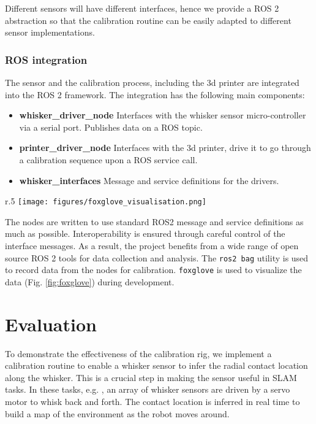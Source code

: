 \documentclass[runningheads]{llncs}
\begin{document}
Different sensors will have different interfaces, hence we provide a ROS 2 abstraction so that the calibration routine can be easily adapted to different sensor implementations.

\subsubsection{ROS integration}

The sensor and the calibration process, including the 3d printer are integrated into the ROS 2 framework. The integration has the following main components:

\begin{itemize}
    \item \textbf{whisker\_driver\_node} Interfaces with the whisker sensor micro-controller via a serial port. Publishes data on a ROS topic.
    \item \textbf{printer\_driver\_node} Interfaces with the 3d printer, drive it to go through a calibration sequence upon a ROS service call.
    \item \textbf{whisker\_interfaces} Message and service definitions for the drivers.
\end{itemize}

\begin{wrapfigure}{r}{.5\textwidth}
    \centering
    \texttt{[image: figures/foxglove\_visualisation.png]}
    \caption{Foxglove visualization of whisker sensor system running in ROS 2}
    \label{fig:foxglove}
\end{wrapfigure}

The nodes are written to use standard ROS2 message and service definitions as much as possible. Interoperability is ensured through careful control of the interface messages. As a result, the project benefits from a wide range of open source ROS 2 tools for data collection and analysis. The \verb|ros2 bag| utility is used to record data from the nodes for calibration. \verb|foxglove| is used to visualize the data (Fig. \ref{fig:foxglove}) during development.

\section{Evaluation}

To demonstrate the effectiveness of the calibration rig, we implement a calibration routine to enable a whisker sensor to infer the radial contact location along the whisker. This is a crucial step in making the sensor useful in SLAM tasks. In these tasks, e.g. \cite{pearsonSimultaneousLocalisationMapping2013} \cite{leporaNaiveBayesNovelty2010}, an array of whisker sensors are driven by a servo motor to whisk back and forth. The contact location is inferred in real time to build a map of the environment as the robot moves around.
\end{document}

